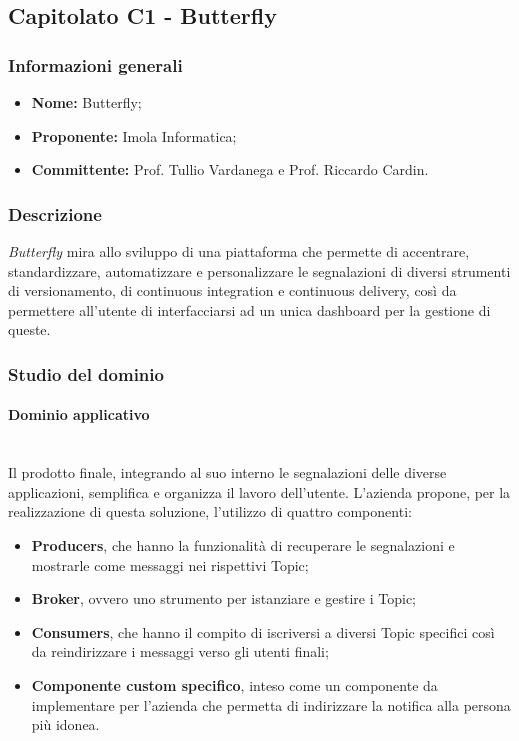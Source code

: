 \subsection{Capitolato C1 - Butterfly}
\subsubsection{Informazioni generali}
\begin{itemize}
\item
\textbf{Nome:} Butterfly;
\item
\textbf{Proponente:} Imola Informatica;
\item
\textbf{Committente:} Prof. Tullio Vardanega e Prof. Riccardo Cardin.
\end{itemize}
\subsubsection{Descrizione}
\textit{Butterfly} mira allo sviluppo di una piattaforma che permette di
 accentrare, standardizzare, automatizzare e personalizzare le segnalazioni di
 diversi strumenti di versionamento, di continuous integration e continuous
 delivery, così da permettere all'utente di interfacciarsi ad un unica 
 dashboard per la gestione di queste.
\subsubsection{Studio del dominio}
\paragraph{Dominio applicativo}\mbox{}\\
Il prodotto finale, integrando al suo interno le segnalazioni delle diverse 
applicazioni, semplifica e organizza il lavoro dell'utente. L'azienda propone,
per la realizzazione di questa soluzione, l'utilizzo di quattro componenti:
\begin{itemize}
	\item \textbf{Producers}, che hanno la funzionalità di recuperare le
	segnalazioni e mostrarle come messaggi nei rispettivi Topic;
	\item \textbf{Broker}, ovvero uno strumento per istanziare e gestire i
	 Topic;
	\item \textbf{Consumers}, che hanno il compito di iscriversi a diversi
	Topic specifici così da reindirizzare i messaggi verso gli utenti finali;
    \item \textbf{Componente custom specifico}, inteso come un componente da
    implementare per l'azienda che permetta di indirizzare la notifica alla
    persona più idonea.
\end{itemize}
